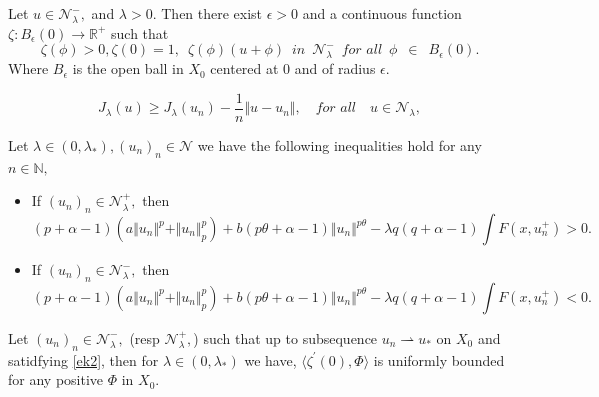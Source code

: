 \documentclass[10pt,a4paper]{amsart}
\begin{document}
\begin{lemma}\label{l4}
Let $ u \in \mathcal{N}_{\lambda}^{-},$ and $ \lambda > 0.$ Then there exist $ \epsilon > 0$ and a continuous function 
$ \zeta : B_{\epsilon}(0) \longrightarrow \mathbb{R}^{+}$ such that
\begin{equation*}
\zeta(\phi) > 0, \zeta(0) = 1, \,\,\, \zeta(\phi)(u +\phi)\,\,\, in\,\,\, \mathcal{N}_{\lambda}^{-} \,\,\, \textit{for all} \,\,\, \phi \,\,\, \in \,\,\, B_{\epsilon}(0).
\end{equation*}
Where  $ B_{\epsilon}$ is the open ball in $ X_0$ centered at $ 0$ and of radius $ \epsilon.$
\end{lemma}

\begin{equation}\label{ek2}
J_{\lambda}(u) \geq J_{\lambda}(u_n) -\frac{1}{n} \Vert u -u_n \Vert, \quad \textit{for all} \quad u \in \mathcal{N}_{\lambda},
\end{equation}

\begin{lemma}\label{l6}
Let $ \lambda \in (0, \lambda_*), (u_n)_n \in \mathcal{N}$ we have the following inequalities hold for any $ n \in \mathbb{N},$
\begin{itemize}
\item If $ (u_n)_n \in \mathcal{N}_{\lambda}^{+},$ then
\begin{equation*}
(p +\alpha -1) \left(a\Vert u_n \Vert^p + \Vert u_n \Vert_{p}^{p}\right) + b(p \theta +\alpha -1)\Vert u_n \Vert^{p \theta} - \lambda q (q +\alpha -1) \int F(x,u_n^+) >0.
\end{equation*}
\item If $ (u_n)_n \in \mathcal{N}_{\lambda}^{-},$ then
\begin{equation*}
(p +\alpha -1) \left(a\Vert u_n \Vert^p + \Vert u_n \Vert_{p}^{p}\right) + b(p \theta +\alpha -1)\Vert u_n \Vert^{p \theta} - \lambda q (q +\alpha -1) \int F(x,u_n^+) <0.
\end{equation*}
\end{itemize}
\end{lemma}

\begin{lemma}\label{l7}
Let $ (u_n)_n \in \mathcal{N}_{\lambda}^{-},$ (resp $ \mathcal{N}_{\lambda}^{+},$) such that up to subsequence  $ u_n \rightharpoonup u_*$ on $ X_0$ and satidfying 
\ref{ek2}, then for $ \lambda \in (0, \lambda_*)$ we have, $ \langle\zeta^{\prime}(0), \Phi \rangle$ is uniformly bounded for any positive $ \Phi$ in $ X_0.$
\end{lemma}
\end{document}

